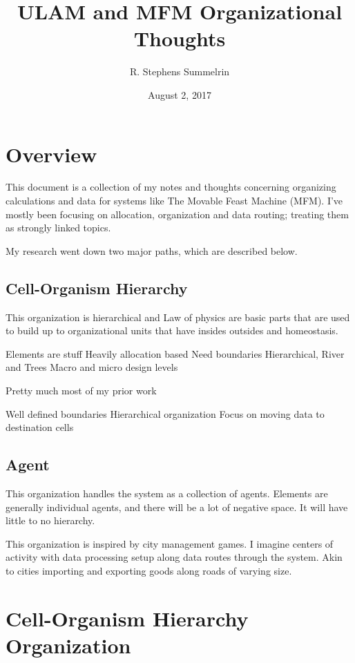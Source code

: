 \documentclass[article,12pt,oneside]{memoir}
\title{ULAM and MFM Organizational Thoughts}
\date{August 2, 2017}
\author{R. Stephens Summelrin}
\begin{document}
\maketitle
\tableofcontents

\pagebreak


\chapter{Overview}

This document is a collection of my notes and thoughts concerning organizing calculations and data for systems like The Movable Feast Machine (MFM). 
I've mostly been focusing on allocation, organization and data routing; treating them as strongly linked topics.

My research went down two major paths, which are described below.


\section{Cell-Organism Hierarchy}

This organization is hierarchical and 
Law of physics are basic parts that are used to build up to organizational units that have insides outsides and homeostasis.

Elements are stuff
Heavily allocation based
Need boundaries
Hierarchical, River and Trees
Macro and micro design levels


Pretty much most of my prior work

Well defined boundaries
Hierarchical organization
Focus on moving data to destination cells



\section{Agent}

This organization handles the system as a collection of agents.
Elements are generally individual agents, and there will be a lot of negative space.
It will have little to no hierarchy.

This organization is inspired by city management games.
I imagine centers of activity with data processing setup along data routes through the system.
Akin to cities importing and exporting goods along roads of varying size.


\chapter{Cell-Organism Hierarchy Organization}
\end{document}

